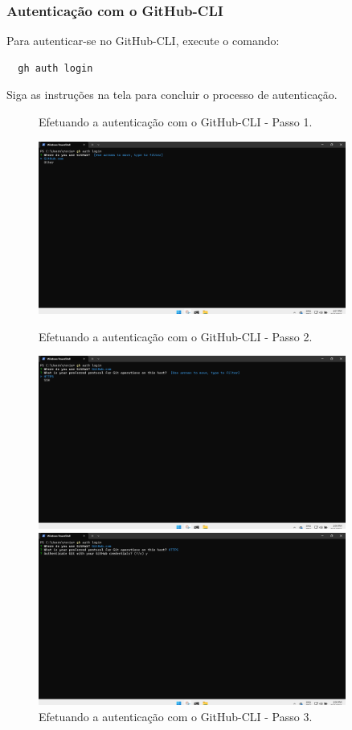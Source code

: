 \subsubsection{Autenticação com o GitHub-CLI}
Para autenticar-se no GitHub-CLI, execute o comando:
\begin{verbatim}
  gh auth login
\end{verbatim}
Siga as instruções na tela para concluir o processo de autenticação.
\begin{figure}[H]
  \centering
  \caption{Efetuando a autenticação com o GitHub-CLI - Passo 1.}
  \label{fig:gh_auth_login_0}
  \includegraphics[width=0.9\textwidth]{./assets/images/13_0_gh_auth_login.png}
  \caption{Efetuando a autenticação com o GitHub-CLI - Passo 2.}
  \label{fig:gh_auth_login_1}
  \includegraphics[width=0.9\textwidth]{./assets/images/13_1_gh_auth_login.png}
  \caption{Efetuando a autenticação com o GitHub-CLI - Passo 3.}
  \label{fig:gh_auth_login_2}
  \includegraphics[width=0.9\textwidth]{./assets/images/13_2_gh_auth_login.png}
\end{figure}
